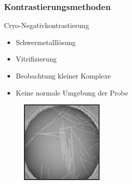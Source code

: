 \begin{frame}
	\frametitle{Kontrastierungsmethoden}
	\begin{block}{Cryo-Negativkontrastierung}
		\begin{itemize}
			\item Schwermetalllösung
			\item Vitrifizierung
			\item Beobachtung kleiner Komplexe
			\item Keine normale Umgebung der Probe
		\end{itemize}
	\end{block}
	\begin{figure}
		\includegraphics[height = 4cm]{pic/cryostain.png}
	\end{figure}
\end{frame}